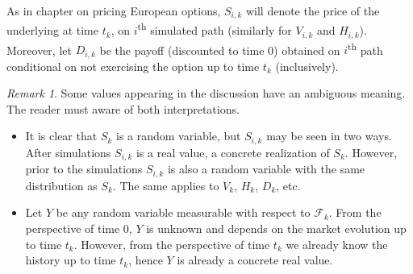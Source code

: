 \documentclass[a4paper,11pt, twoside]{book}
\theoremstyle{definition}
\theoremstyle{remark}
\newtheorem{remark}{Remark}[chapter]
\begin{document}
As in chapter on pricing European options, $S_{i,k}$ will denote the price of the underlying at time $t_k$, on $i$\textsuperscript{th} simulated path (similarly for $V_{i,k}$ and $H_{i,k}$). Moreover, let $D_{i,k}$ be the payoff (discounted to time 0) obtained on $i$\textsuperscript{th} path conditional on not exercising the option up to time $t_k$ (inclusively).
\begin{remark}
  Some values appearing in the discussion have an ambiguous meaning. The reader must aware of both interpretations.
 \begin{itemize}
  \item It is clear that $S_{k}$ is a random variable, but $S_{i,k}$ may be seen in two ways. After simulations $S_{i,k}$ is a real value, a concrete realization of $S_{k}$. However, prior to the simulations $S_{i,k}$ is also a random variable with the same distribution as $S_k$. The same applies to  $V_k$, $H_k$, $D_k$, etc.
  \item Let $Y$ be any random variable measurable with respect to $\mathcal{F}_k$. From the perspective of time 0, $Y$ is unknown and depends on the market evolution up to time $t_k$. However, from the perspective of time $t_k$ we already know the history up to time $t_k$, hence $Y$ is already a concrete real value.
 \end{itemize}
\end{remark}
\end{document}
